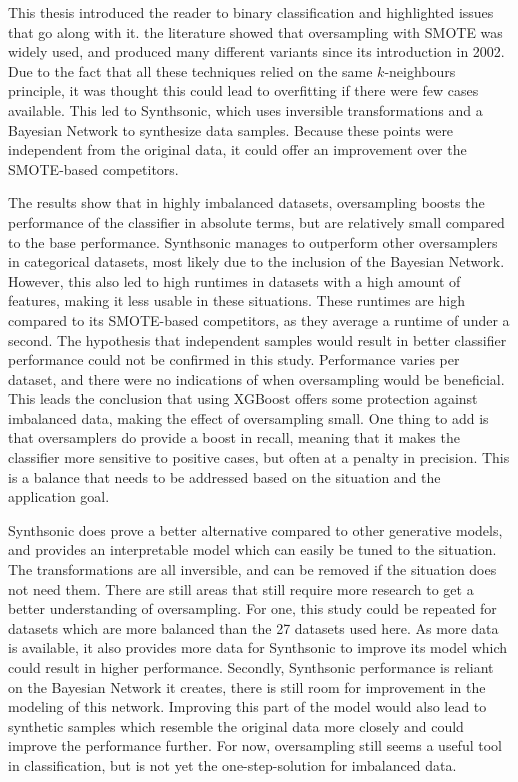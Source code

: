 This thesis introduced the reader to binary classification and highlighted issues that go along with it. the literature showed that oversampling with SMOTE was widely used, and produced many different variants since its introduction in 2002. Due to the fact that all these techniques relied on the same $k$-neighbours principle, it was thought this could lead to overfitting if there were few cases available. This led to Synthsonic, which uses inversible transformations and a Bayesian Network to synthesize data samples. Because these points were independent from the original data, it could offer an improvement over the SMOTE-based competitors. 

The results show that in highly imbalanced datasets, oversampling boosts the performance of the classifier in absolute terms, but are relatively small compared to the base performance. Synthsonic manages to outperform other oversamplers in categorical datasets, most likely due to the inclusion of the Bayesian Network. However, this also led to high runtimes in datasets with a high amount of features, making it less usable in these situations. These runtimes are high compared to its SMOTE-based competitors, as they average a runtime of under a second. The hypothesis that independent samples would result in better classifier performance could not be confirmed in this study. Performance varies per dataset, and there were no indications of when oversampling would be beneficial. This leads the conclusion that using XGBoost offers some protection against imbalanced data, making the effect of oversampling small. One thing to add is that oversamplers do provide a boost in recall, meaning that it makes the classifier more sensitive to positive cases, but often at a penalty in precision. This is a balance that needs to be addressed based on the situation and the application goal. 

Synthsonic does prove a better alternative compared to other generative models, and provides an interpretable model which can easily be tuned to the situation. The transformations are all inversible, and can be removed if the situation does not need them. There are still areas that still require more research to get a better understanding of oversampling. For one, this study could be repeated for datasets which are more balanced than the 27 datasets used here. As more data is available, it also provides more data for Synthsonic to improve its model which could result in higher performance. Secondly, Synthsonic performance is reliant on the Bayesian Network it creates, there is still room for improvement in the modeling of this network. Improving this part of the model would also lead to synthetic samples which resemble the original data more closely and could improve the performance further. For now, oversampling still seems a useful tool in classification, but is not yet the one-step-solution for imbalanced data.
